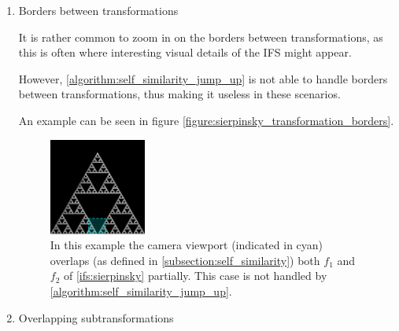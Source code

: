 \documentclass[11pt]{article}
\begin{document}
\begin{enumerate}
\item Borders between transformations
\label{sec:org36c880e}


It is rather common to zoom in on the borders between transformations, as this is often
where interesting visual details of the IFS might appear.

However, \autoref{algorithm:self_similarity_jump_up} is not able to handle borders between transformations,
thus making it useless in these scenarios.

An example can be seen in figure \autoref{figure:sierpinsky_transformation_borders}.

\begin{figure}
\centering
\includegraphics[width=0.3\textwidth]{figures/sierpinsky_transformation_borders}
\caption{In this example the camera viewport (indicated in cyan) overlaps (as defined in \autoref{subsection:self_similarity}) both $f_1$ and $f_2$ of \autoref{ifs:sierpinsky} partially. This case is not handled by \autoref{algorithm:self_similarity_jump_up}. }
\label{figure:sierpinsky_transformation_borders}
\end{figure}

\item Overlapping subtransformations
\label{sec:orga3a4183}


\end{enumerate}
\end{document}
